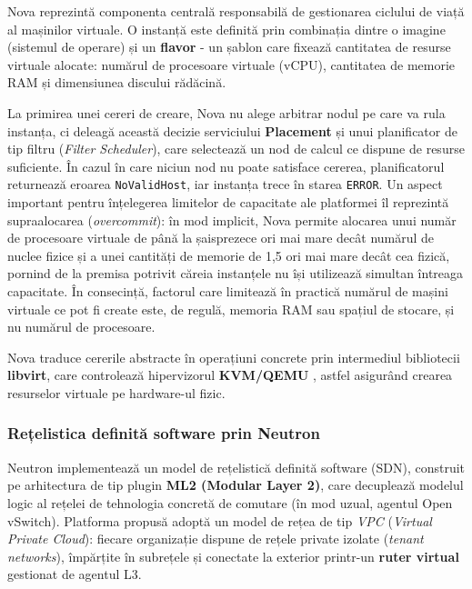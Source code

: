 Nova reprezintă componenta centrală responsabilă de gestionarea ciclului de viață al mașinilor virtuale. O instanță este definită prin combinația dintre o imagine (sistemul de operare) și un \textbf{flavor} - un șablon care fixează cantitatea de resurse virtuale alocate: numărul de procesoare virtuale (vCPU), cantitatea de memorie RAM și dimensiunea discului rădăcină.

La primirea unei cereri de creare, Nova nu alege arbitrar nodul pe care va rula instanța, ci deleagă această decizie serviciului \textbf{Placement} \cite{openstack_placement} și unui planificator de tip filtru (\textit{Filter Scheduler}), care selectează un nod de calcul ce dispune de resurse suficiente. În cazul în care niciun nod nu poate satisface cererea, planificatorul returnează eroarea \texttt{NoValidHost}, iar instanța trece în starea \texttt{ERROR}. Un aspect important pentru înțelegerea limitelor de capacitate ale platformei îl reprezintă supraalocarea (\textit{overcommit}): în mod implicit, Nova permite alocarea unui număr de procesoare virtuale de până la șaisprezece ori mai mare decât numărul de nuclee fizice și a unei cantități de memorie de 1,5 ori mai mare decât cea fizică, pornind de la premisa potrivit căreia instanțele nu își utilizează simultan întreaga capacitate. În consecință, factorul care limitează în practică numărul de mașini virtuale ce pot fi create este, de regulă, memoria RAM sau spațiul de stocare, și nu numărul de procesoare.

Nova traduce cererile abstracte în operațiuni concrete prin intermediul bibliotecii \textbf{libvirt}, care controlează hipervizorul \textbf{KVM/QEMU} \cite{linux_kvm}, astfel asigurând crearea resurselor virtuale pe hardware-ul fizic.

\subsubsection{Rețelistica definită software prin Neutron}

Neutron implementează un model de rețelistică definită software (SDN), construit pe arhitectura de tip plugin \textbf{ML2 (Modular Layer 2)}, care decuplează modelul logic al rețelei de tehnologia concretă de comutare (în mod uzual, agentul Open vSwitch). Platforma propusă adoptă un model de rețea de tip \textit{VPC} (\textit{Virtual Private Cloud}): fiecare organizație dispune de rețele private izolate (\textit{tenant networks}), împărțite în subrețele și conectate la exterior printr-un \textbf{ruter virtual} gestionat de agentul L3.

